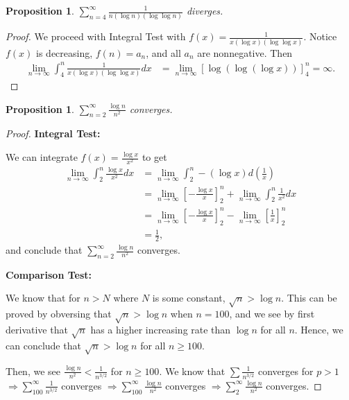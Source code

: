 \documentclass{article}
\newtheorem{proposition}[thm]{Proposition}
\begin{document}
\begin{proposition}
    $\sum_{n=4}^{\infty}\frac{1}{n(\log n)(\log\log n)}$ diverges.
\end{proposition}
\begin{proof}
    We proceed with Integral Test with $f(x)=\frac{1}{x(\log x)(\log\log x)}$. Notice $f(x)$ is 
    decreasing, $f(n) = a_n$, and all $a_n$ are nonnegative. Then
    \begin{align*}
        \lim_{n\to\infty}\int_{4}^{n}\frac{1}{x(\log x)(\log\log x)}dx & = 
        \lim_{n\to\infty}\left[\log(\log(\log x))\right]_4^n = \infty.
    \end{align*}
\end{proof}

\newpage
\begin{proposition}
    $\sum_{n=2}^{\infty}\frac{\log n}{n^2}$ converges.
\end{proposition}
\begin{proof}
    \textbf{Integral Test:} 

    We can integrate $f(x)=\frac{\log x}{x^2}$ to get
    \begin{align*}
        \lim_{n\to\infty}\int_{2}^{n}\frac{\log x}{x^2}dx & = 
        \lim_{n\to\infty}\int_{2}^{n}-(\log x)d\left(\frac{1}{x}\right) \\
        & = \lim_{n\to\infty}\left[-\frac{\log x}{x}\right]_2^n +
        \lim_{n\to\infty}\int_{2}^{n}\frac{1}{x^2}dx \\
        & = \lim_{n\to\infty}\left[-\frac{\log x}{x}\right]_2^n -
        \lim_{n\to\infty}\left[\frac{1}{x}\right]_2^n \\
        & = \frac{1}{2},
    \end{align*}
    and conclude that $\sum_{n=2}^{\infty}\frac{\log n}{n^2}$ converges.

    \textbf{Comparison Test:}

    We know that for $n>N$ where $N$ is some constant, $\sqrt{n} > \log n$. This can be proved by 
    obversing that $\sqrt{n} > \log n$ when $n = 100$, and we see by first derivative that 
    $\sqrt{n}$ has a higher increasing rate than $\log n$ for all $n$. Hence, we can conclude that 
    $\sqrt{n} > \log n$ for all $n\ge 100$.

    Then, we see $\frac{\log n}{n^2} < \frac{1}{n^{3/2}}$ for $n\ge 100$. We know that 
    $\sum \frac{1}{n^{3/2}}$ converges for $p>1$ $\Rightarrow \sum_{100}^{\infty}\frac{1}{n^{3/2}}$
    converges $\Rightarrow \sum_{100}^{\infty}\frac{\log n}{n^2}$ converges $\Rightarrow 
    \sum_{2}^{\infty}\frac{\log n}{n^2}$ converges.
\end{proof}
\end{document}
